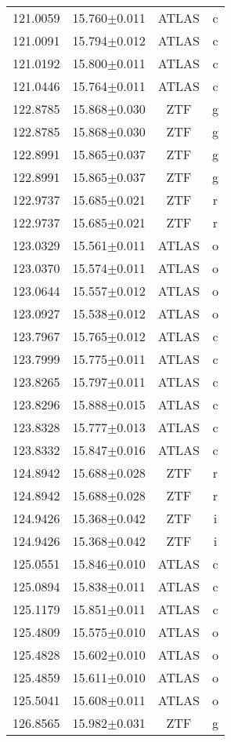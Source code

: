 \begin{table}
\begin{tabular}{cccc}
121.0059 & 15.760$\pm$0.011 & ATLAS & c \\
121.0091 & 15.794$\pm$0.012 & ATLAS & c \\
121.0192 & 15.800$\pm$0.011 & ATLAS & c \\
121.0446 & 15.764$\pm$0.011 & ATLAS & c \\
122.8785 & 15.868$\pm$0.030 & ZTF & g \\
122.8785 & 15.868$\pm$0.030 & ZTF & g \\
122.8991 & 15.865$\pm$0.037 & ZTF & g \\
122.8991 & 15.865$\pm$0.037 & ZTF & g \\
122.9737 & 15.685$\pm$0.021 & ZTF & r \\
122.9737 & 15.685$\pm$0.021 & ZTF & r \\
123.0329 & 15.561$\pm$0.011 & ATLAS & o \\
123.0370 & 15.574$\pm$0.011 & ATLAS & o \\
123.0644 & 15.557$\pm$0.012 & ATLAS & o \\
123.0927 & 15.538$\pm$0.012 & ATLAS & o \\
123.7967 & 15.765$\pm$0.012 & ATLAS & c \\
123.7999 & 15.775$\pm$0.011 & ATLAS & c \\
123.8265 & 15.797$\pm$0.011 & ATLAS & c \\
123.8296 & 15.888$\pm$0.015 & ATLAS & c \\
123.8328 & 15.777$\pm$0.013 & ATLAS & c \\
123.8332 & 15.847$\pm$0.016 & ATLAS & c \\
124.8942 & 15.688$\pm$0.028 & ZTF & r \\
124.8942 & 15.688$\pm$0.028 & ZTF & r \\
124.9426 & 15.368$\pm$0.042 & ZTF & i \\
124.9426 & 15.368$\pm$0.042 & ZTF & i \\
125.0551 & 15.846$\pm$0.010 & ATLAS & c \\
125.0894 & 15.838$\pm$0.011 & ATLAS & c \\
125.1179 & 15.851$\pm$0.011 & ATLAS & c \\
125.4809 & 15.575$\pm$0.010 & ATLAS & o \\
125.4828 & 15.602$\pm$0.010 & ATLAS & o \\
125.4859 & 15.611$\pm$0.010 & ATLAS & o \\
125.5041 & 15.608$\pm$0.011 & ATLAS & o \\
126.8565 & 15.982$\pm$0.031 & ZTF & g \\

\end{tabular}
\end{table}
